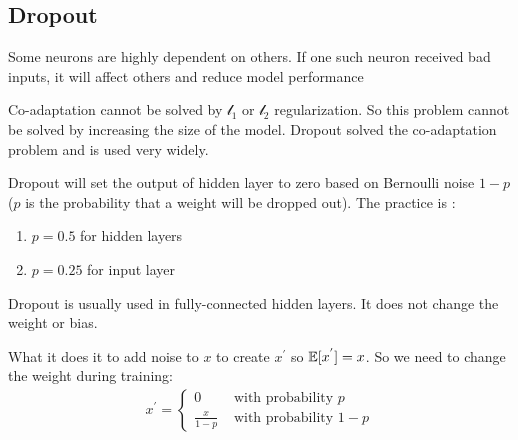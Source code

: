 \subsection{Dropout}

\begin{definition}[Co-adaptation]
    Some neurons are highly dependent on others. If one such neuron received bad inputs, it will affect others and reduce model performance    
\end{definition}

Co-adaptation cannot be solved by $\mathcal{l}_1$ or $\mathcal{l}_2$ regularization. So this problem cannot be solved by increasing the size of the model. Dropout solved the co-adaptation problem and is used very widely.

Dropout will set the output of hidden layer to zero based on Bernoulli noise $1-p$ ($p$ is the probability that a weight will be dropped out). The practice is :
\begin{enumerate}
    \item $p=0.5$ for hidden layers
    \item $p= 0.25$ for input layer
\end{enumerate}

Dropout is usually used in fully-connected hidden layers. It does not change the weight or bias. 



What it does it to add noise to $x$ to create $x^{'}$ so $\mathbb{E}[{x^{'}}]= x$. So we need to change the weight during training:
\begin{equation}
    \begin{aligned}
        x^{'} = \begin{cases}
            0 & \text{ with probability }  p \\
            \displaystyle \frac{x}{1-p} & \text{ with probability }  1-p
        \end{cases}
    \end{aligned}
\end{equation}


